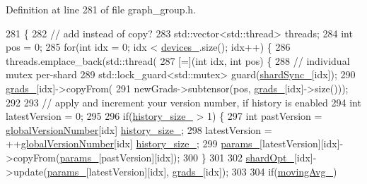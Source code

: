 Definition at line 281 of file graph\+\_\+group.\+h.


\begin{DoxyCode}
281                                       \{
282     \textcolor{comment}{// add instead of copy?}
283     std::vector<std::thread> threads;
284     \textcolor{keywordtype}{int} pos = 0;
285     \textcolor{keywordflow}{for}(\textcolor{keywordtype}{int} idx = 0; idx < \hyperlink{classmarian_1_1AsyncGraphGroup_a9fcc6fe896fe0c623a1cde656c6e123e}{devices\_}.size(); idx++) \{
286       threads.emplace\_back(std::thread(
287           [=](\textcolor{keywordtype}{int} idx, \textcolor{keywordtype}{int} pos) \{
288             \textcolor{comment}{// individual mutex per-shard}
289             std::lock\_guard<std::mutex> guard(\hyperlink{classmarian_1_1AsyncGraphGroup_a5bf268b84c19070341c67f9c8617b1b2}{shardSync\_}[idx]);
290             \hyperlink{classmarian_1_1AsyncGraphGroup_ad2f8bc6900976be4426acc4631d07145}{grads\_}[idx]->copyFrom(
291                 newGrads->subtensor(pos, \hyperlink{classmarian_1_1AsyncGraphGroup_ad2f8bc6900976be4426acc4631d07145}{grads\_}[idx]->size()));
292 
293             \textcolor{comment}{// apply and increment your version number, if history is enabled}
294             \textcolor{keywordtype}{int} latestVersion = 0;
295 
296             \textcolor{keywordflow}{if}(\hyperlink{classmarian_1_1AsyncGraphGroup_a0958c1384fc7486dd4f739d69c9ac636}{history\_size\_} > 1) \{
297               \textcolor{keywordtype}{int} pastVersion = \hyperlink{classmarian_1_1AsyncGraphGroup_a75884703e6fe8efb3c75293eb912bce4}{globalVersionNumber}[idx] %
      \hyperlink{classmarian_1_1AsyncGraphGroup_a0958c1384fc7486dd4f739d69c9ac636}{history\_size\_};
298               latestVersion = ++\hyperlink{classmarian_1_1AsyncGraphGroup_a75884703e6fe8efb3c75293eb912bce4}{globalVersionNumber}[idx] %
      \hyperlink{classmarian_1_1AsyncGraphGroup_a0958c1384fc7486dd4f739d69c9ac636}{history\_size\_};
299               \hyperlink{classmarian_1_1AsyncGraphGroup_ad1bf15e55cc12b90d39012303b14767b}{params\_}[latestVersion][idx]->copyFrom(\hyperlink{classmarian_1_1AsyncGraphGroup_ad1bf15e55cc12b90d39012303b14767b}{params\_}[pastVersion][idx]);
300             \}
301 
302             \hyperlink{classmarian_1_1AsyncGraphGroup_a6a9bb34a29290c20f17e3ed25e08eff3}{shardOpt\_}[idx]->update(\hyperlink{classmarian_1_1AsyncGraphGroup_ad1bf15e55cc12b90d39012303b14767b}{params\_}[latestVersion][idx], 
      \hyperlink{classmarian_1_1AsyncGraphGroup_ad2f8bc6900976be4426acc4631d07145}{grads\_}[idx]);
303 
304             \textcolor{keywordflow}{if}(\hyperlink{classmarian_1_1AsyncGraphGroup_a96d6309b1924939d4b77ef1ed3a119d7}{movingAvg\_})

\end{DoxyCode}
